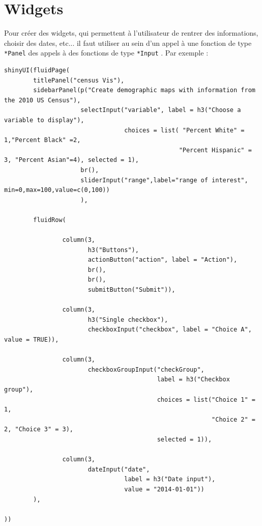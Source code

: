 \documentclass{article}
\begin{document}
\section{Widgets}
Pour créer des widgets, qui permettent à l'utilisateur de rentrer des informations, choisir des dates, etc... il faut utiliser au sein d'un appel à une fonction de type \verb!*Panel! des appels à des fonctions de type \verb!*Input! .
Par exemple :
\begin{verbatim}
shinyUI(fluidPage(
        titlePanel("census Vis"),
        sidebarPanel(p("Create demographic maps with information from the 2010 US Census"),
                     selectInput("variable", label = h3("Choose a variable to display"), 
                                 choices = list( "Percent White" = 1,"Percent Black" =2,
                                                "Percent Hispanic" = 3, "Percent Asian"=4), selected = 1),
                     br(),
                     sliderInput("range",label="range of interest", min=0,max=100,value=c(0,100))
                     ),
        
        fluidRow(
                
                column(3,
                       h3("Buttons"),
                       actionButton("action", label = "Action"),
                       br(),
                       br(), 
                       submitButton("Submit")),
                
                column(3,
                       h3("Single checkbox"),
                       checkboxInput("checkbox", label = "Choice A", value = TRUE)),
                
                column(3, 
                       checkboxGroupInput("checkGroup", 
                                          label = h3("Checkbox group"), 
                                          choices = list("Choice 1" = 1, 
                                                         "Choice 2" = 2, "Choice 3" = 3),
                                          selected = 1)),
                
                column(3, 
                       dateInput("date", 
                                 label = h3("Date input"), 
                                 value = "2014-01-01"))   
        ),
        
))
\end{verbatim}
\end{document}
